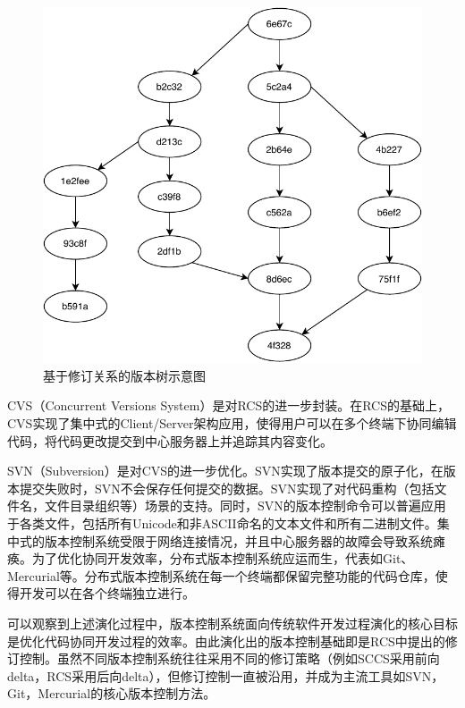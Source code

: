 \documentclass{cjc}
\begin{document}
\begin{figure}[htb]
  \centering
  \includegraphics[width=\linewidth]{versiontree.pdf}
  \caption{基于修订关系的版本树示意图}
  \label{versiontree}
\end{figure}



CVS（Concurrent Versions System）是对RCS的进一步封装。在RCS的基础上，CVS实现了集中式的Client/Server架构应用，使得用户可以在多个终端下协同编辑代码，将代码更改提交到中心服务器上并追踪其内容变化。

SVN（Subversion）是对CVS的进一步优化。SVN实现了版本提交的原子化，在版本提交失败时，SVN不会保存任何提交的数据。SVN实现了对代码重构（包括文件名，文件目录组织等）场景的支持。同时，SVN的版本控制命令可以普遍应用于各类文件，包括所有Unicode和非ASCII命名的文本文件和所有二进制文件。集中式的版本控制系统受限于网络连接情况，并且中心服务器的故障会导致系统瘫痪。为了优化协同开发效率，分布式版本控制系统应运而生，代表如Git、Mercurial等。分布式版本控制系统在每一个终端都保留完整功能的代码仓库，使得开发可以在各个终端独立进行。

可以观察到上述演化过程中，版本控制系统面向传统软件开发过程演化的核心目标是优化代码协同开发过程的效率。由此演化出的版本控制基础即是RCS中提出的修订控制。虽然不同版本控制系统往往采用不同的修订策略（例如SCCS采用前向delta，RCS采用后向delta），但修订控制一直被沿用，并成为主流工具如SVN，Git，Mercurial的核心版本控制方法。
\end{document}
